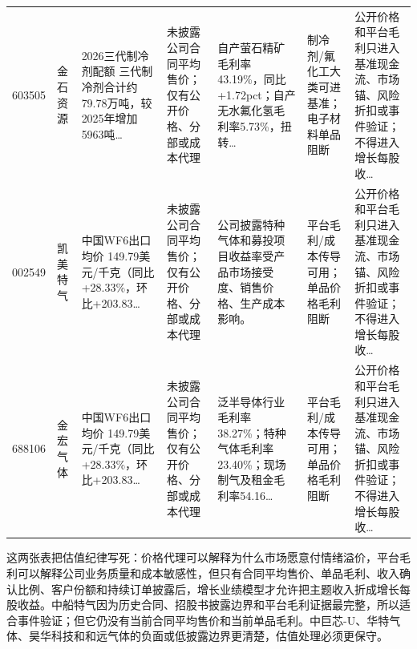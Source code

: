 \begin{exhibitbox}[价格与毛利入模门禁（2）]
\begin{tabularx}{\exhibitboxwidth}{L{0.85cm} L{1.05cm} X X X X X}
603505 & 金石资源 & 2026三代制冷剂配额 三代制冷剂合计约79.78万吨，较2025年增加5963吨… & 未披露公司合同平均售价；仅有公开价格、分部或成本代理 & 自产萤石精矿毛利率43.19\%，同比+1.72pct；自产无水氟化氢毛利率5.73\%，扭转… & 制冷剂/氟化工大类可进基准；电子材料单品阻断 & 公开价格和平台毛利只进入基准现金流、市场锚、风险折扣或事件验证；不得进入增长每股收… \\
002549 & 凯美特气 & 中国WF6出口均价 149.79美元/千克（同比+28.33\%，环比+203.83… & 未披露公司合同平均售价；仅有公开价格、分部或成本代理 & 公司披露特种气体和募投项目收益率受产品市场接受度、销售价格、生产成本影响。 & 平台毛利/成本传导可用；单品价格毛利阻断 & 公开价格和平台毛利只进入基准现金流、市场锚、风险折扣或事件验证；不得进入增长每股收… \\
688106 & 金宏气体 & 中国WF6出口均价 149.79美元/千克（同比+28.33\%，环比+203.83… & 未披露公司合同平均售价；仅有公开价格、分部或成本代理 & 泛半导体行业毛利率38.27\%；特种气体毛利率23.40\%；现场制气及租金毛利率54.16… & 平台毛利/成本传导可用；单品价格毛利阻断 & 公开价格和平台毛利只进入基准现金流、市场锚、风险折扣或事件验证；不得进入增长每股收… \\
\bottomrule
\end{tabularx}
\end{exhibitbox}


这两张表把估值纪律写死：价格代理可以解释为什么市场愿意付情绪溢价，平台毛利可以解释公司业务质量和成本敏感性，但只有合同平均售价、单品毛利、收入确认比例、客户份额和持续订单披露后，增长业绩模型才允许把主题收入折成增长每股收益。中船特气因为历史合同、招股书披露边界和平台毛利证据最完整，所以适合事件验证；但它仍没有当前合同平均售价和当前单品毛利。中巨芯-U、华特气体、昊华科技和和远气体的负面或低披露边界更清楚，估值处理必须更保守。

